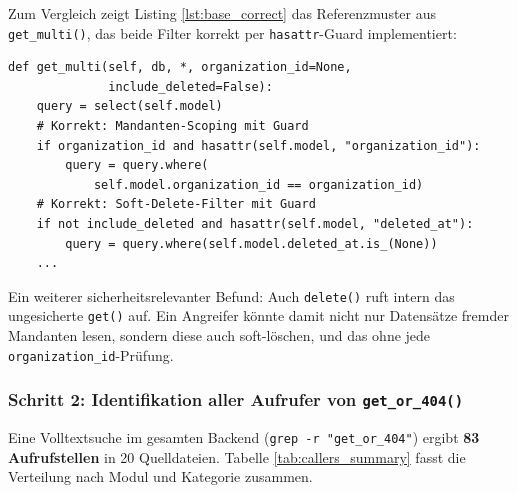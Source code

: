 Zum Vergleich zeigt Listing \ref{lst:base_correct} das Referenzmuster aus
\texttt{get\_multi()}, das beide Filter korrekt per \texttt{hasattr}-Guard implementiert:

\begin{lstlisting}[style=custompython,
  caption={Korrektes Referenzmuster aus \texttt{get\_multi()} -- Zeilen 36--57},
  label={lst:base_correct}]
def get_multi(self, db, *, organization_id=None,
              include_deleted=False):
    query = select(self.model)
    # Korrekt: Mandanten-Scoping mit Guard
    if organization_id and hasattr(self.model, "organization_id"):
        query = query.where(
            self.model.organization_id == organization_id)
    # Korrekt: Soft-Delete-Filter mit Guard
    if not include_deleted and hasattr(self.model, "deleted_at"):
        query = query.where(self.model.deleted_at.is_(None))
    ...
\end{lstlisting}

Ein weiterer sicherheitsrelevanter Befund: Auch \texttt{delete()} ruft intern das
ungesicherte \texttt{get()} auf. Ein Angreifer könnte damit nicht nur Datensätze
fremder Mandanten lesen, sondern diese auch soft-löschen, und das ohne jede
\texttt{organization\_id}-Prüfung.

\subsubsection{Schritt 2: Identifikation aller Aufrufer von \texttt{get\_or\_404()}}

Eine Volltextsuche im gesamten Backend (\texttt{grep -r "get\_or\_404"}) ergibt
\textbf{83 Aufrufstellen} in 20 Quelldateien. Tabelle \ref{tab:callers_summary}
fasst die Verteilung nach Modul und Kategorie zusammen.

